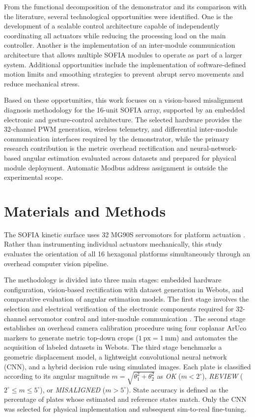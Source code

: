 \documentclass[lettersize,journal]{IEEEtran}
\begin{document}
	From the functional decomposition of the demonstrator and its comparison with
	the literature, several technological opportunities were identified. One is
	the development of a scalable control architecture capable of independently
	coordinating all actuators while reducing the processing load on the main
	controller. Another is the implementation of an inter-module communication
	architecture that allows multiple SOFIA modules to operate as part of a larger
	system. Additional opportunities include the implementation of
	software-defined motion limits and smoothing strategies to prevent abrupt
	servo movements and reduce mechanical stress.
	
	Based on these opportunities, this work focuses on a vision-based misalignment diagnosis methodology for the 16-unit SOFIA array, supported by an embedded electronic and gesture-control architecture. The selected hardware provides the 32-channel PWM generation, wireless telemetry, and differential inter-module communication interfaces required by the demonstrator, while the primary research contribution is the metric overhead rectification and neural-network-based angular estimation evaluated across datasets and prepared for physical module deployment. Automatic Modbus address assignment is outside the experimental scope.
	
	
	\section{Materials and Methods}
	\label{sec:methods}
	
	The SOFIA kinetic surface uses 32 MG90S servomotors for platform actuation \cite{sofia_architecture,mg90s}. Rather than instrumenting individual actuators mechanically, this study evaluates the orientation of all 16 hexagonal platforms simultaneously through an overhead computer vision pipeline.

	The methodology is divided into three main stages: embedded hardware configuration, vision-based rectification with dataset generation in Webots, and comparative evaluation of angular estimation models. The first stage involves the selection and electrical verification of the electronic components required for 32-channel servomotor control and inter-module communication \cite{technical_session}. The second stage establishes an overhead camera calibration procedure using four coplanar ArUco markers to generate metric top-down crops ($1~\text{px} = 1~\text{mm}$) and automates the acquisition of labeled datasets in Webots. The third stage benchmarks a geometric displacement model, a lightweight convolutional neural network (CNN), and a hybrid decision rule using simulated images. Each plate is classified according to its angular magnitude $m=\sqrt{\theta_1^2+\theta_2^2}$ as \textit{OK} ($m<2^\circ$), \textit{REVIEW} ($2^\circ\leq m\leq5^\circ$), or \textit{MISALIGNED} ($m>5^\circ$). State accuracy is defined as the percentage of plates whose estimated and reference states match. Only the CNN was selected for physical implementation and subsequent sim-to-real fine-tuning.
	
\end{document}
